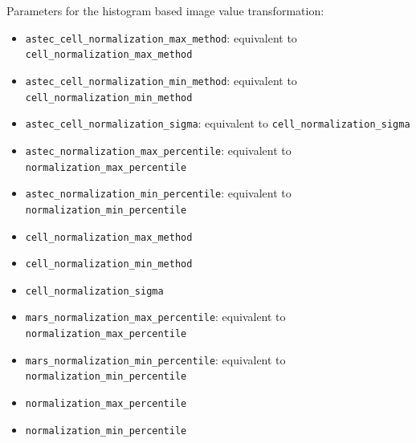 Parameters for the histogram based image value transformation:
\begin{itemize}
\itemsep -0.5ex
\item \texttt{astec\_cell\_normalization\_max\_method}: equivalent to
      \texttt{cell\_normalization\_max\_method}
\item \texttt{astec\_cell\_normalization\_min\_method}: equivalent to
      \texttt{cell\_normalization\_min\_method}
\item \texttt{astec\_cell\_normalization\_sigma}: equivalent to
      \texttt{cell\_normalization\_sigma}
\item \texttt{astec\_normalization\_max\_percentile}: equivalent to
      \texttt{normalization\_max\_percentile}
\item \texttt{astec\_normalization\_min\_percentile}: equivalent to
      \texttt{normalization\_min\_percentile}
\item \texttt{cell\_normalization\_max\_method}
\item \texttt{cell\_normalization\_min\_method}
\item \texttt{cell\_normalization\_sigma}
\item \texttt{mars\_normalization\_max\_percentile}: equivalent to
      \texttt{normalization\_max\_percentile}
\item \texttt{mars\_normalization\_min\_percentile}: equivalent to
      \texttt{normalization\_min\_percentile}
\item \texttt{normalization\_max\_percentile}
\item \texttt{normalization\_min\_percentile}
\end{itemize}

